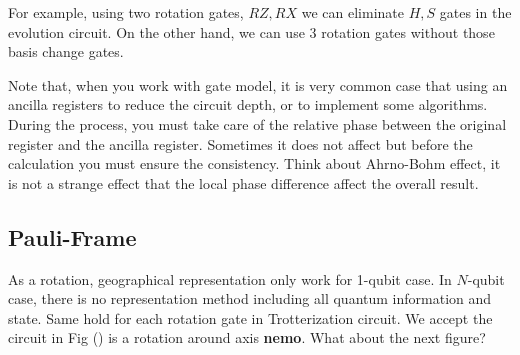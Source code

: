 For example, using two rotation gates, $RZ, RX$
we can eliminate $H, S$ gates in the evolution circuit.
On the other hand, we can use 3 rotation gates
without those basis change gates. 




Note that, when you work with gate model,
it is very common case that using an ancilla registers
to reduce the circuit depth, or to implement some algorithms.
During the process, you must take care of the relative 
phase between the original register and the ancilla register.
Sometimes it does not affect but before the calculation 
you must ensure the consistency.
Think about Ahrno-Bohm effect, it is not a strange 
effect that the local phase difference affect the overall
result.

\subsection{Pauli-Frame}

As a rotation, geographical representation only work for 
1-qubit case.
In $N$-qubit case, there is no representation method 
including all quantum information and state.
Same hold for each rotation gate in Trotterization circuit.
We accept the circuit in Fig () is a rotation around axis \textbf{nemo}.
What about the next figure?

